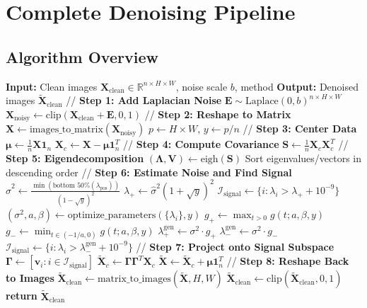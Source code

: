 \documentclass[12pt,a4paper]{article}
\begin{document}
\section{Complete Denoising Pipeline}

\subsection{Algorithm Overview}

\begin{algorithm}
\caption{Random Matrix Image Denoising}
\begin{algorithmic}[1]
\State \textbf{Input:} Clean images $\mathbf{X}_{\text{clean}} \in \mathbb{R}^{n \times H \times W}$, noise scale $b$, method
\State \textbf{Output:} Denoised images $\tilde{\mathbf{X}}_{\text{clean}}$
\State
\State // \textbf{Step 1: Add Laplacian Noise}
\State $\mathbf{E} \sim \text{Laplace}(0, b)^{n \times H \times W}$
\State $\mathbf{X}_{\text{noisy}} \gets \text{clip}(\mathbf{X}_{\text{clean}} + \mathbf{E}, 0, 1)$
\State
\State // \textbf{Step 2: Reshape to Matrix}
\State $\mathbf{X} \gets \text{images\_to\_matrix}(\mathbf{X}_{\text{noisy}})$ 
\State $p \gets H \times W$, $y \gets p/n$
\State
\State // \textbf{Step 3: Center Data}
\State $\boldsymbol{\mu} \gets \frac{1}{n}\mathbf{X}\mathbf{1}_n$
\State $\mathbf{X}_c \gets \mathbf{X} - \boldsymbol{\mu}\mathbf{1}_n^T$
\State
\State // \textbf{Step 4: Compute Covariance}
\State $\mathbf{S} \gets \frac{1}{n}\mathbf{X}_c \mathbf{X}_c^T$
\State
\State // \textbf{Step 5: Eigendecomposition}
\State $(\mathbf{\Lambda}, \mathbf{V}) \gets \text{eigh}(\mathbf{S})$
\State Sort eigenvalues/vectors in descending order
\State
\State // \textbf{Step 6: Estimate Noise and Find Signal}
    \State $\hat{\sigma}^2 \gets \frac{\min(\text{bottom 50\%}(\lambda_{\text{pos}}))}{(1-\sqrt{y})^2}$
    \State $\lambda_+ \gets \hat{\sigma}^2(1+\sqrt{y})^2$
    \State $\mathcal{I}_{\text{signal}} \gets \{i : \lambda_i > \lambda_+ + 10^{-9}\}$
    \State $(\sigma^2, a, \beta) \gets \text{optimize\_parameters}(\{\lambda_i\}, y)$
    \State $g_+ \gets \max_{t>0} g(t; a, \beta, y)$
    \State $g_- \gets \min_{t \in (-1/a,0)} g(t; a, \beta, y)$
    \State $\lambda_+^{\text{gen}} \gets \sigma^2 \cdot g_+$
    \State $\lambda_-^{\text{gen}} \gets \sigma^2 \cdot g_-$
    \State $\mathcal{I}_{\text{signal}} \gets \{i : \lambda_i > \lambda_-^{\text{gen}} + 10^{-9}\}$
\EndIf
\State
\State // \textbf{Step 7: Project onto Signal Subspace}
\State $\mathbf{\Gamma} \gets [\mathbf{v}_i : i \in \mathcal{I}_{\text{signal}}]$
\State $\tilde{\mathbf{X}}_c \gets \mathbf{\Gamma}\mathbf{\Gamma}^T \mathbf{X}_c$
\State $\tilde{\mathbf{X}} \gets \tilde{\mathbf{X}}_c + \boldsymbol{\mu}\mathbf{1}_n^T$
\State
\State // \textbf{Step 8: Reshape Back to Images}
\State $\tilde{\mathbf{X}}_{\text{clean}} \gets \text{matrix\_to\_images}(\tilde{\mathbf{X}}, H, W)$
\State $\tilde{\mathbf{X}}_{\text{clean}} \gets \text{clip}(\tilde{\mathbf{X}}_{\text{clean}}, 0, 1)$
\State
\State \textbf{return} $\tilde{\mathbf{X}}_{\text{clean}}$
\end{algorithmic}
\end{algorithm}
\end{document}
